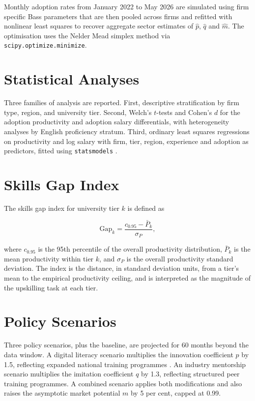 \documentclass[11pt,a4paper]{report}
\begin{document}
Monthly adoption rates from January 2022 to May 2026 are simulated using
firm specific Bass parameters that are then pooled across firms and
refitted with nonlinear least squares to recover aggregate sector
estimates of $\hat{p}$, $\hat{q}$ and $\hat{m}$. The optimisation uses
the Nelder Mead simplex method via \texttt{scipy.optimize.minimize}.

\section{Statistical Analyses}

Three families of analysis are reported. First, descriptive
stratification by firm type, region, and university tier. Second, Welch's
$t$-tests and Cohen's $d$ \citep{Cohen1988,HedgesOlkin1985} for the
adoption productivity and adoption salary differentials, with
heterogeneity analyses by English proficiency stratum. Third, ordinary
least squares regressions on productivity and log salary with firm,
tier, region, experience and adoption as predictors, fitted using
\texttt{statsmodels} \citep{Seabold2010Statsmodels}.

\section{Skills Gap Index}

The skills gap index for university tier $k$ is defined as

\begin{equation}
\mathrm{Gap}_k = \frac{c_{0.95} - \bar{P}_k}{\sigma_P},
\end{equation}

where $c_{0.95}$ is the 95th percentile of the overall productivity
distribution, $\bar{P}_k$ is the mean productivity within tier $k$,
and $\sigma_P$ is the overall productivity standard deviation. The
index is the distance, in standard deviation units, from a tier's mean
to the empirical productivity ceiling, and is interpreted as the
magnitude of the upskilling task at each tier.

\section{Policy Scenarios}

Three policy scenarios, plus the baseline, are projected for 60 months
beyond the data window. A digital literacy scenario multiplies the
innovation coefficient $p$ by 1.5, reflecting expanded national
training programmes \citep{a2iDigitalLiteracy2024}. An industry
mentorship scenario multiplies the imitation coefficient $q$ by 1.3,
reflecting structured peer training programmes. A combined scenario
applies both modifications and also raises the asymptotic market
potential $m$ by 5 per cent, capped at 0.99.
\end{document}
